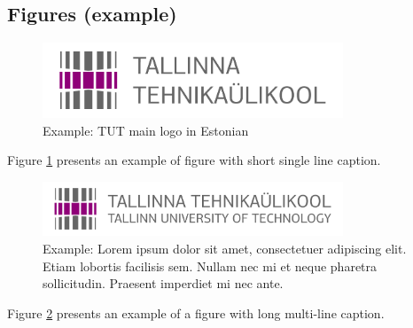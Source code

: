 \subsection{Figures (example)}


\begin{figure}[!ht]
  \centering
  \includegraphics[width=0.8\textwidth]{chExamples2/figures/TTU_peamine_logo_EST_print}
  \caption{ Example: TUT main logo in Estonian}
  \label{fig:logo}
\end{figure}

Figure \ref{fig:logo} presents an example of figure with short single
line caption.

\begin{figure}[!ht]
  \centering
  \includegraphics[width=0.8\textwidth]{chExamples2/figures/TTU_alternatiivne_logo_EST_ENG_print}
  \caption{Example: Lorem ipsum dolor sit amet, consectetuer
    adipiscing elit. Etiam lobortis facilisis sem. Nullam nec mi et
    neque pharetra sollicitudin. Praesent imperdiet mi nec ante.
  }
  \label{fig:logo2}
\end{figure}

Figure \ref{fig:logo2} presents an example of a figure with long multi-line caption.


